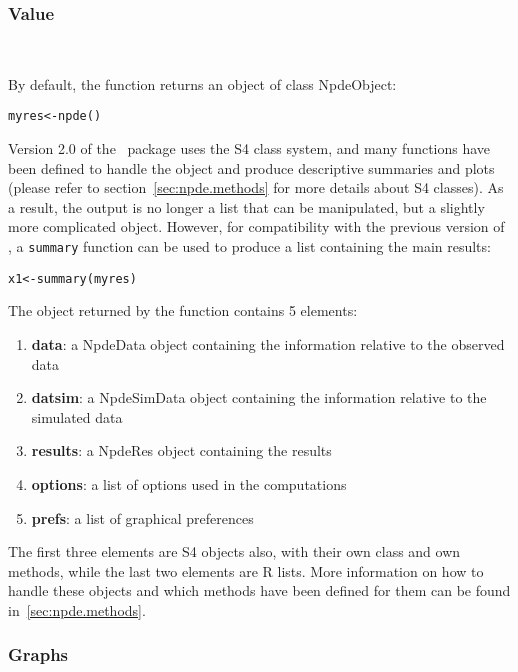 \subsubsection{Value}~\label{sec:value}

\hskip 18pt By default, the function returns an object of class NpdeObject:
\begin{verbatim}
myres<-npde()
\end{verbatim}
Version 2.0 of the \npde~package uses the S4 class system, and many functions have been defined to handle the object and produce descriptive summaries and plots (please refer to section~\ref{sec:npde.methods} for more details about S4 classes). As a result, the output is no longer a list that can be manipulated, but a slightly more complicated object. However, for compatibility with the previous version of \npde, a \texttt{summary} function can be used to produce a list containing the main results:
\begin{verbatim}
x1<-summary(myres)
\end{verbatim}

\bigskip
The object returned by the function contains 5 elements:
\begin{enumerate}
\item \textbf{data}: a NpdeData object containing the information relative to the observed data
\item \textbf{datsim}: a NpdeSimData object containing the information relative to the simulated data
\item \textbf{results}: a NpdeRes object containing the results
\item \textbf{options}: a list of options used in the computations
\item \textbf{prefs}: a list of graphical preferences
\end{enumerate}
The first three elements are S4 objects also, with their own class and own methods, while the last two elements are R lists. More information on how to handle these objects and which methods have been defined for them can be found in~\ref{sec:npde.methods}.

\subsubsection{Graphs} \label{sec:graphics}

